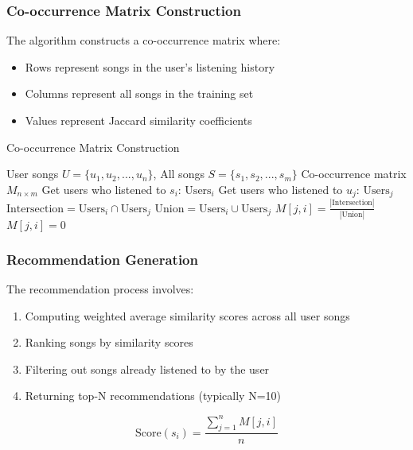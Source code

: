 \documentclass[12pt,a4paper]{article}
\begin{document}
\subsubsection{Co-occurrence Matrix Construction}
The algorithm constructs a co-occurrence matrix where:
\begin{itemize}
    \item Rows represent songs in the user's listening history
    \item Columns represent all songs in the training set
    \item Values represent Jaccard similarity coefficients
\end{itemize}

\begin{algorithm}
\caption{Co-occurrence Matrix Construction}
\begin{algorithmic}[1]
\REQUIRE User songs $U = \{u_1, u_2, ..., u_n\}$, All songs $S = \{s_1, s_2, ..., s_m\}$
\ENSURE Co-occurrence matrix $M_{n \times m}$
    \STATE Get users who listened to $s_i$: $\text{Users}_i$
        \STATE Get users who listened to $u_j$: $\text{Users}_j$
        \STATE $\text{Intersection} = \text{Users}_i \cap \text{Users}_j$
        \STATE $\text{Union} = \text{Users}_i \cup \text{Users}_j$
            \STATE $M[j,i] = \frac{|\text{Intersection}|}{|\text{Union}|}$
        \ELSE
            \STATE $M[j,i] = 0$
        \ENDIF
    \ENDFOR
\ENDFOR
\end{algorithmic}
\end{algorithm}

\subsubsection{Recommendation Generation}
The recommendation process involves:
\begin{enumerate}
    \item Computing weighted average similarity scores across all user songs
    \item Ranking songs by similarity scores
    \item Filtering out songs already listened to by the user
    \item Returning top-N recommendations (typically N=10)
\end{enumerate}

\begin{equation}
\text{Score}(s_i) = \frac{\sum_{j=1}^{n} M[j,i]}{n}
\end{equation}
\end{document}
